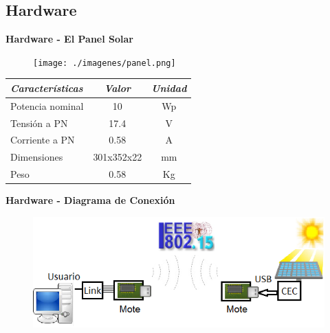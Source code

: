 \documentclass[aspectratio=43, handout]{beamer}
\begin{document}
\subsection[Hardware]{Hardware}
\begin{frame}{\textbf{\LARGE{Hardware - El Panel Solar}}}
\begin{center}
			\begin{figure}[H]
			\texttt{[image: ./imagenes/panel.png]}
		\end{figure}	
	\vspace{10px}	
	\begin{tabular}{@{} l *2c @{}}    %
		\hline
		\emph{\textbf{Características}} & \emph{\textbf{Valor}} & \emph{\textbf{Unidad}}\\
		\hline
		Potencia nominal	& 10 	& Wp	\\	
		Tensión a PN		& 17.4	& V\\
		Corriente a PN	& 0.58		& A\\
		Dimensiones		& 301x352x22 	& mm\\
		Peso				& 0.58		& Kg	\\
		\hline
	\end{tabular}
\end{center}
\end{frame}


\begin{frame}{\textbf{\LARGE{Hardware - Diagrama de Conexión}}}
		\begin{figure}[H]
			\includegraphics[width=1\textwidth]{./imagenes/conex.png}
		\end{figure}	
\end{frame}
\end{document}
